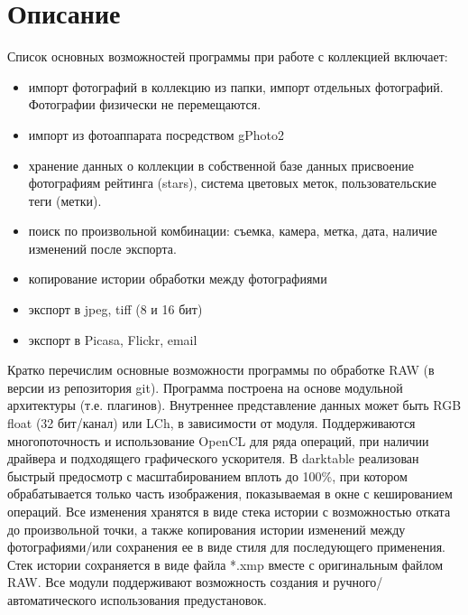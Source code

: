 \documentclass[10pt, a5paper]{article}
\begin{document}
\section*{Описание}
Список основных возможностей программы при работе с коллекцией включает:
\begin{itemize}
\item импорт фотографий в коллекцию из папки, импорт отдельных фотографий. Фотографии физически не перемещаются.
\item импорт из фотоаппарата посредством gPhoto2
\item хранение данных о коллекции в собственной базе данных
присвоение фотографиям рейтинга (stars), система цветовых меток, пользовательские теги (метки).
\item поиск по произвольной комбинации: съемка, камера, метка, дата, наличие изменений после экспорта.
\item копирование истории обработки между фотографиями
\item экспорт в jpeg, tiff (8 и 16 бит) 
\item экспорт в Picasa, Flickr, email
	\end{itemize} 
Кратко перечислим основные возможности программы по обработке RAW (в версии из репозитория git). Программа построена на основе модульной архитектуры (т.е. плагинов). Внутреннее представление данных может быть RGB float (32 бит/канал) или LCh, в зависимости от модуля. Поддерживаются многопоточность и использование OpenCL для ряда операций, при наличии драйвера и подходящего графического ускорителя.
В darktable реализован быстрый предосмотр с масштабированием вплоть до 100\%, при котором обрабатывается только часть изображения, показываемая в окне с кешированием операций. Все изменения хранятся в виде стека истории с возможностью отката до произвольной точки, а также копирования истории изменений между фотографиями/или сохранения ее в виде стиля для последующего применения. Стек истории сохраняется в виде файла *.xmp вместе с оригинальным файлом RAW.
Все модули поддерживают возможность создания и ручного/автоматического использования предустановок. 
\begin{figure}[ht]
\end{figure}
\end{document}
